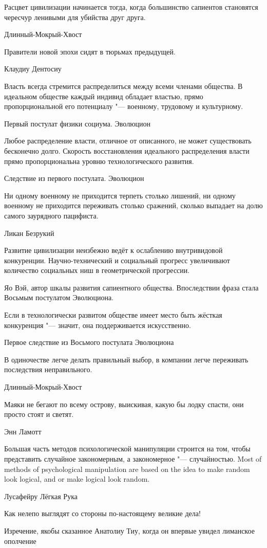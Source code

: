 \epigraph
{Расцвет цивилизации начинается тогда, когда большинство сапиентов становятся чересчур ленивыми для убийства друг друга.}
{Длинный-Мокрый-Хвост}

\epigraph
{Правители новой эпохи сидят в тюрьмах предыдущей.}
{Клаудиу Дентосиу}

\epigraph
{Власть всегда стремится распределиться между всеми членами общества.
В идеальном обществе каждый индивид обладает властью, прямо пропорциональной его потенциалу "--- военному, трудовому и культурному.}
{Первый постулат физики социума. Эволюцион}

\epigraph
{Любое распределение власти, отличное от описанного, не может существовать бесконечно долго.
Скорость восстановления идеального распределения власти прямо пропорциональна уровню технологического развития.}
{Следствие из первого постулата. Эволюцион}

\epigraph
{Ни одному военному не приходится терпеть столько лишений, ни одному военному не приходится переживать столько сражений, сколько выпадает на долю самого заурядного пацифиста.}
{Ликан Безрукий}

\epigraph
{Развитие цивилизации неизбежно ведёт к ослаблению внутривидовой конкуренции.
Научно-технический и социальный прогресс увеличивают количество социальных ниш в геометрической прогрессии.}
{Яо Вэй, автор шкалы развития сапиентного общества.
Впоследствии фраза стала Восьмым постулатом Эволюциона.}

\epigraph{Если в технологически развитом обществе имеет место быть жёсткая конкуренция "--- значит, она поддерживается искусственно.}
{Первое следствие из Восьмого постулата Эволюциона}

\epigraph
{В одиночестве легче делать правильный выбор, в компании легче переживать последствия неправильного.}
{Длинный-Мокрый-Хвост}

\epigraph
{Маяки не бегают по всему острову, выискивая, какую бы лодку спасти, они просто стоят и светят.}
{Энн Ламотт}

\epigraph{
{Большая часть методов психологической манипуляции строится на том, чтобы представить случайное закономерным, а закономерное "--- случайностью.}
{Most of methods of psychological manipulation are based on the idea to make random look logical, and or make logical look random.}
}{Лусафейру Лёгкая Рука}

\epigraph
{Как нелепо выглядят со стороны по-настоящему великие дела!}
{Изречение, якобы сказанное Анатолиу Тиу, когда он впервые увидел лиманское ополчение}

